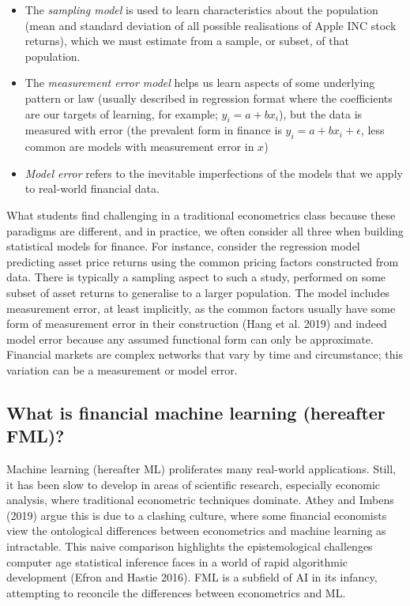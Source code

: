 \documentclass{article}
\begin{document}
\begin{itemize}
\tightlist
\item
  The \emph{sampling model} is used to learn characteristics about the
  population (mean and standard deviation of all possible realisations
  of Apple INC stock returns), which we must estimate from a sample, or
  subset, of that population.
\item
  The \emph{measurement error model} helps us learn aspects of some
  underlying pattern or law (usually described in regression format
  where the coefficients are our targets of learning, for example;
  \(y_i=a+bx_i\)), but the data is measured with error (the prevalent
  form in finance is \(y_i=a+bx_i+\epsilon\), less common are models
  with measurement error in \(x\))
\item
  \emph{Model error} refers to the inevitable imperfections of the
  models that we apply to real-world financial data.
\end{itemize}

What students find challenging in a traditional econometrics class
because these paradigms are different, and in practice, we often
consider all three when building statistical models for finance. For
instance, consider the regression model predicting asset price returns
using the common pricing factors constructed from data. There is
typically a sampling aspect to such a study, performed on some subset of
asset returns to generalise to a larger population. The model includes
measurement error, at least implicitly, as the common factors usually
have some form of measurement error in their construction (Hang et al.
2019) and indeed model error because any assumed functional form can
only be approximate. Financial markets are complex networks that vary by
time and circumstance; this variation can be a measurement or model
error.

\hypertarget{what-is-financial-machine-learning-hereafter-fml}{%
\subsection{What is financial machine learning (hereafter
FML)?}\label{what-is-financial-machine-learning-hereafter-fml}}

Machine learning (hereafter ML) proliferates many real-world
applications. Still, it has been slow to develop in areas of scientific
research, especially economic analysis, where traditional econometric
techniques dominate. Athey and Imbens (2019) argue this is due to a
clashing culture, where some financial economists view the ontological
differences between econometrics and machine learning as intractable.
This naive comparison highlights the epistemological challenges computer
age statistical inference faces in a world of rapid algorithmic
development (Efron and Hastie 2016). FML is a subfield of AI in its
infancy, attempting to reconcile the differences between econometrics
and ML.
\end{document}
